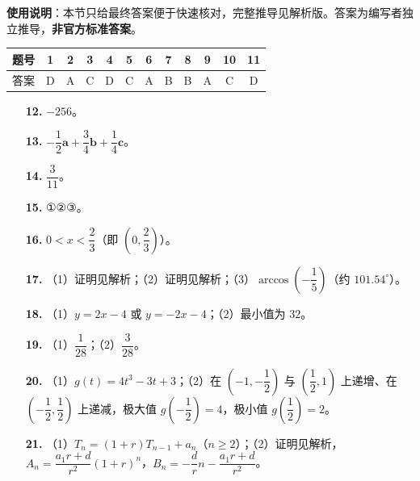 
\begin{gknotice}
\textbf{使用说明}：本节只给最终答案便于快速核对，完整推导见解析版。答案为编写者独立推导，\textbf{非官方标准答案}。
\end{gknotice}

\begin{center}\begin{tabular}{cccccccccccc}
\toprule
题号 & 1 & 2 & 3 & 4 & 5 & 6 & 7 & 8 & 9 & 10 & 11 \\
\midrule
答案 & D & A & C & D & C & A & B & B & A & C & D \\
\bottomrule
\end{tabular}\end{center}

\begin{itemize}[leftmargin=2.6em]
  \item[\textbf{12.}] $-256$。
  \item[\textbf{13.}] $-\dfrac12\boldsymbol a+\dfrac34\boldsymbol b+\dfrac14\boldsymbol c$。
  \item[\textbf{14.}] $\dfrac{3}{11}$。
  \item[\textbf{15.}] ①②③。
\end{itemize}

\begin{itemize}[leftmargin=2.6em]
  \item[\textbf{16.}] $0<x<\dfrac23$（即 $\left(0,\dfrac23\right)$）。
  \item[\textbf{17.}] （1）证明见解析；（2）证明见解析；（3）$\arccos\left(-\dfrac15\right)$（约 $101.54^\circ$）。
  \item[\textbf{18.}] （1）$y=2x-4$ 或 $y=-2x-4$；（2）最小值为 $32$。
  \item[\textbf{19.}] （1）$\dfrac{1}{28}$；（2）$\dfrac{3}{28}$。
  \item[\textbf{20.}] （1）$g(t)=4t^3-3t+3$；（2）在 $\left(-1,-\dfrac12\right)$ 与 $\left(\dfrac12,1\right)$ 上递增、在 $\left(-\dfrac12,\dfrac12\right)$ 上递减，极大值 $g\left(-\dfrac12\right)=4$，极小值 $g\left(\dfrac12\right)=2$。
  \item[\textbf{21.}] （1）$T_n=(1+r)T_{n-1}+a_n$（$n\geqslant2$）；（2）证明见解析，$A_n=\dfrac{a_1r+d}{r^2}(1+r)^n$，$B_n=-\dfrac drn-\dfrac{a_1r+d}{r^2}$。
\end{itemize}
